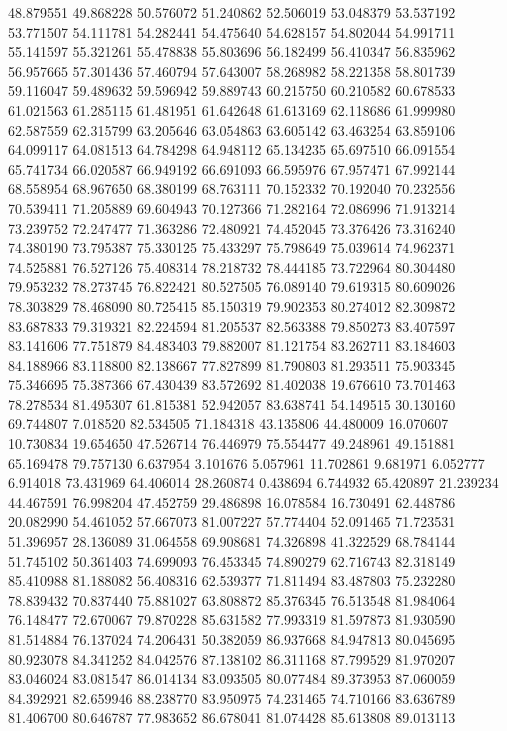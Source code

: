48.879551
49.868228
50.576072
51.240862
52.506019
53.048379
53.537192
53.771507
54.111781
54.282441
54.475640
54.628157
54.802044
54.991711
55.141597
55.321261
55.478838
55.803696
56.182499
56.410347
56.835962
56.957665
57.301436
57.460794
57.643007
58.268982
58.221358
58.801739
59.116047
59.489632
59.596942
59.889743
60.215750
60.210582
60.678533
61.021563
61.285115
61.481951
61.642648
61.613169
62.118686
61.999980
62.587559
62.315799
63.205646
63.054863
63.605142
63.463254
63.859106
64.099117
64.081513
64.784298
64.948112
65.134235
65.697510
66.091554
65.741734
66.020587
66.949192
66.691093
66.595976
67.957471
67.992144
68.558954
68.967650
68.380199
68.763111
70.152332
70.192040
70.232556
70.539411
71.205889
69.604943
70.127366
71.282164
72.086996
71.913214
73.239752
72.247477
71.363286
72.480921
74.452045
73.376426
73.316240
74.380190
73.795387
75.330125
75.433297
75.798649
75.039614
74.962371
74.525881
76.527126
75.408314
78.218732
78.444185
73.722964
80.304480
79.953232
78.273745
76.822421
80.527505
76.089140
79.619315
80.609026
78.303829
78.468090
80.725415
85.150319
79.902353
80.274012
82.309872
83.687833
79.319321
82.224594
81.205537
82.563388
79.850273
83.407597
83.141606
77.751879
84.483403
79.882007
81.121754
83.262711
83.184603
84.188966
83.118800
82.138667
77.827899
81.790803
81.293511
75.903345
75.346695
75.387366
67.430439
83.572692
81.402038
19.676610
73.701463
78.278534
81.495307
61.815381
52.942057
83.638741
54.149515
30.130160
69.744807
7.018520
82.534505
71.184318
43.135806
44.480009
16.070607
10.730834
19.654650
47.526714
76.446979
75.554477
49.248961
49.151881
65.169478
79.757130
6.637954
3.101676
5.057961
11.702861
9.681971
6.052777
6.914018
73.431969
64.406014
28.260874
0.438694
6.744932
65.420897
21.239234
44.467591
76.998204
47.452759
29.486898
16.078584
16.730491
62.448786
20.082990
54.461052
57.667073
81.007227
57.774404
52.091465
71.723531
51.396957
28.136089
31.064558
69.908681
74.326898
41.322529
68.784144
51.745102
50.361403
74.699093
76.453345
74.890279
62.716743
82.318149
85.410988
81.188082
56.408316
62.539377
71.811494
83.487803
75.232280
78.839432
70.837440
75.881027
63.808872
85.376345
76.513548
81.984064
76.148477
72.670067
79.870228
85.631582
77.993319
81.597873
81.930590
81.514884
76.137024
74.206431
50.382059
86.937668
84.947813
80.045695
80.923078
84.341252
84.042576
87.138102
86.311168
87.799529
81.970207
83.046024
83.081547
86.014134
83.093505
80.077484
89.373953
87.060059
84.392921
82.659946
88.238770
83.950975
74.231465
74.710166
83.636789
81.406700
80.646787
77.983652
86.678041
81.074428
85.613808
89.013113
